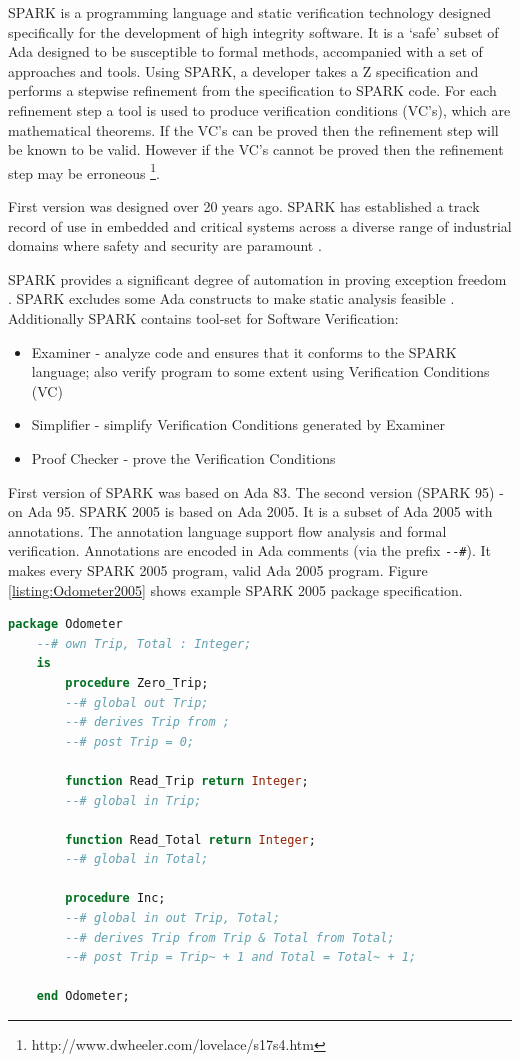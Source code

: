 SPARK is a programming language and static verification technology designed specifically for the development of high integrity software. It is a `safe' subset of Ada designed to be susceptible to formal methods, accompanied with a set of approaches and tools. Using SPARK, a developer takes a Z specification and performs a stepwise refinement from the specification to SPARK code. For each refinement step a tool is used to produce verification conditions (VC's), which are mathematical theorems. If the VC's can be proved then the refinement step will be known to be valid. However if the VC's cannot be proved then the refinement step may be erroneous \footnote{http://www.dwheeler.com/lovelace/s17s4.htm}.

First version was designed over 20 years ago. SPARK has established a track record of use in embedded and critical systems across a diverse range of industrial domains where safety and security are paramount \cite{Barnes:Book}. 

SPARK provides a significant degree of automation in proving exception freedom \cite{Spark:Article}. SPARK excludes some Ada constructs to make static analysis feasible \cite{Spark:Article}. Additionally SPARK contains tool-set for Software Verification:
\begin{itemize} \itemsep1pt \parskip0pt 
	\item Examiner - analyze code and ensures that it conforms to the SPARK language; also verify program to some extent using Verification Conditions (VC)
	\item Simplifier - simplify Verification Conditions generated by Examiner
	\item Proof Checker - prove the Verification Conditions
\end{itemize}

First version of SPARK was based on Ada 83. The second version (SPARK 95) - on Ada 95. SPARK 2005 is based on Ada 2005. It is a subset of Ada 2005 with annotations. The annotation language support flow analysis and formal verification. Annotations are encoded in Ada comments (via the prefix \lstinline{--#}). It makes every SPARK 2005 program, valid Ada 2005 program. Figure \ref{listing:Odometer2005} shows example SPARK 2005 package specification.

\singlespacing
\begin{lstlisting}[language=ada, frame=single, gobble=0, caption={SPARK 2005 code: Odometer \cite{Barnes:Book}}, label={listing:Odometer2005}]
	package Odometer
	--# own Trip, Total : Integer;
	is
		procedure Zero_Trip;
		--# global out Trip;
		--# derives Trip from ;
		--# post Trip = 0;

		function Read_Trip return Integer;
		--# global in Trip;

		function Read_Total return Integer;
		--# global in Total;

		procedure Inc;
		--# global in out Trip, Total;
		--# derives Trip from Trip & Total from Total;
		--# post Trip = Trip~ + 1 and Total = Total~ + 1;

	end Odometer;
\end{lstlisting} 
\doublespacing

